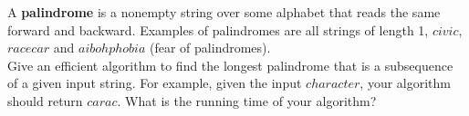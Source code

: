 \begin{homeworkProblem}
A \textbf{palindrome} is a nonempty string over some alphabet that reads the
same forward and backward. Examples of palindromes are all strings of length 1,
$civic$, $racecar$ and $aibohphobia$ (fear of palindromes). \\
Give an efficient algorithm to find the longest palindrome that is a subsequence
of a given input string. For example, given the input $character$, your algorithm
should return $carac$. What is the running time of your algorithm?

\segline

\solution


\end{homeworkProblem}
